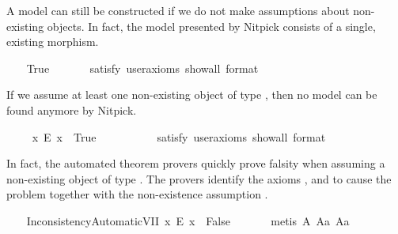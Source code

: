 \begin{isabellebody}
\begin{isamarkuptext}
A model can still be constructed if we do not make assumptions about non-existing
  objects. In fact, the model presented by Nitpick consists of a single, existing morphism.%
\end{isamarkuptext}\isamarkuptrue%
\ \ \isamarkupfalse%
\ True\ \isanewline
\ \ \ \ \isamarkupfalse%
\ {\isacharbrackleft}satisfy{\isacharcomma}\ user{\isacharunderscore}axioms{\isacharcomma}\ show{\isacharunderscore}all{\isacharcomma}\ format\ {\isacharequal}\ {}{\isacharbrackright}%
\isadelimproof
\ %
\endisadelimproof
%
\isatagproof
{}\isamarkupfalse%
\ %
%
\endisatagproof
{\isafoldproof}%
%
\isadelimproof
%
\endisadelimproof
%
\begin{isamarkuptext}%
If we assume at least one non-existing object of type , then no model 
 can be found anymore by Nitpick.%
\end{isamarkuptext}\isamarkuptrue%
\ \ \isamarkupfalse%
\ \ {\isachardoublequoteopen}{\isasymexists}x{\isachardot}\ \isactrlbold {\isasymnot}{\isacharparenleft}E\ x{\isacharparenright}{\isachardoublequoteclose}\ \ True\ \ \ %
\ \isanewline
\ \ \ \ \isamarkupfalse%
\ {\isacharbrackleft}satisfy{\isacharcomma}\ user{\isacharunderscore}axioms{\isacharcomma}\ show{\isacharunderscore}all{\isacharcomma}\ format\ {\isacharequal}\ {}{\isacharbrackright}%
\isadelimproof
\ %
\endisadelimproof
%
\isatagproof
{}\isamarkupfalse%
%
\endisatagproof
{\isafoldproof}%
%
\isadelimproof
%
\endisadelimproof
%
\begin{isamarkuptext}%
In fact, the automated theorem provers quickly prove falsity when assuming a 
 non-existing object of type . The provers identify the axioms , 
 and  to cause the problem together with the non-existence assumption .%
\end{isamarkuptext}\isamarkuptrue%
\ \ \isamarkupfalse%
\ InconsistencyAutomaticVII{\isacharcolon}\ {\isachardoublequoteopen}{\isacharparenleft}{\isasymexists}x{\isachardot}\ \isactrlbold {\isasymnot}{\isacharparenleft}E\ x{\isacharparenright}{\isacharparenright}\ \isactrlbold {\isasymrightarrow}\ False{\isachardoublequoteclose}\ \isanewline
%
\isadelimproof
\ \ \ \ %
\endisadelimproof
%
\isatagproof
{}\isamarkupfalse%
\ {\isacharparenleft}metis\ A{}\ A{}a\ A{}a{\isacharparenright}%

\end{isabellebody}
